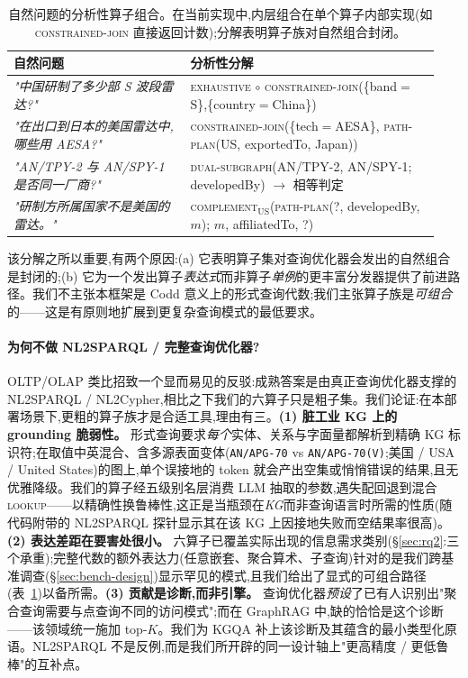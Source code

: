 \documentclass[11pt,a4paper]{article}
\newcommand{\op}[1]{\textsc{\small #1}}
\begin{document}
\begin{table}[h]
\centering\small
\caption{自然问题的分析性算子组合。在当前实现中,内层组合在单个算子内部实现(如 \op{constrained-join} 直接返回计数);分解表明算子族对自然组合封闭。}
\label{tab:composability}
\begin{tabular}{p{0.39\linewidth} p{0.55\linewidth}}
\toprule
\textbf{自然问题} & \textbf{分析性分解} \\
\midrule
\emph{"中国研制了多少部 S 波段雷达?"} & \op{exhaustive} $\circ$ \op{constrained-join}(\{band$\!=\!$S\},\{country$\!=\!$China\}) \\
\emph{"在出口到日本的美国雷达中,哪些用 AESA?"} & \op{constrained-join}(\{tech$\!=\!$AESA\}, \op{path-plan}(US, exportedTo, Japan)) \\
\emph{"AN/TPY-2 与 AN/SPY-1 是否同一厂商?"} & \op{dual-subgraph}(AN/TPY-2, AN/SPY-1; developedBy) $\to$ 相等判定 \\
\emph{"研制方所属国家不是美国的雷达。"} & \op{complement}$_{\text{US}}$(\op{path-plan}(?, developedBy, $m$); $m$, affiliatedTo, ?) \\
\bottomrule
\end{tabular}
\end{table}

该分解之所以重要,有两个原因:(a) 它表明算子集对查询优化器会发出的自然组合是封闭的;(b) 它为一个发出算子\emph{表达式}而非算子\emph{单例}的更丰富分发器提供了前进路径。我们不主张本框架是 Codd \citep{codd1970relational} 意义上的形式查询代数;我们主张算子族是\emph{可组合}的——这是有原则地扩展到更复杂查询模式的最低要求。

\paragraph{为何不做 NL2SPARQL / 完整查询优化器?}
OLTP/OLAP 类比招致一个显而易见的反驳:成熟答案是由真正查询优化器支撑的 NL2SPARQL / NL2Cypher,相比之下我们的六算子只是粗子集。我们论证:在本部署场景下,更粗的算子族才是合适工具,理由有三。\textbf{(1) 脏工业 KG 上的 grounding 脆弱性。} 形式查询要求\emph{每个}实体、关系与字面量都解析到精确 KG 标识符;在取值中英混合、含多源表面变体(\texttt{AN/APG-70} vs \texttt{AN/APG-70(V)};美国 / USA / United States)的图上,单个误接地的 token 就会产出空集或悄悄错误的结果,且无优雅降级。我们的算子经五级别名层消费 LLM 抽取的参数,遇失配回退到混合 \op{lookup}——以精确性换鲁棒性,这正是当瓶颈在\emph{KG}而非查询语言时所需的性质(随代码附带的 NL2SPARQL 探针显示其在该 KG 上因接地失败而空结果率很高)。\textbf{(2) 表达差距在要害处很小。} 六算子已覆盖实际出现的信息需求类别(\S\ref{sec:rq2}:三个承重);完整代数的额外表达力(任意嵌套、聚合算术、子查询)针对的是我们跨基准调查(\S\ref{sec:bench-design})显示罕见的模式,且我们给出了显式的可组合路径(表~\ref{tab:composability})以备所需。\textbf{(3) 贡献是诊断,而非引擎。} 查询优化器\emph{预设}了已有人识别出"聚合查询需要与点查询不同的访问模式";而在 GraphRAG 中,缺的恰恰是这个诊断——该领域统一施加 top-$K$。我们为 KGQA 补上该诊断及其蕴含的最小类型化原语。NL2SPARQL 不是反例,而是我们所开辟的同一设计轴上"更高精度 / 更低鲁棒"的互补点。
\end{document}
